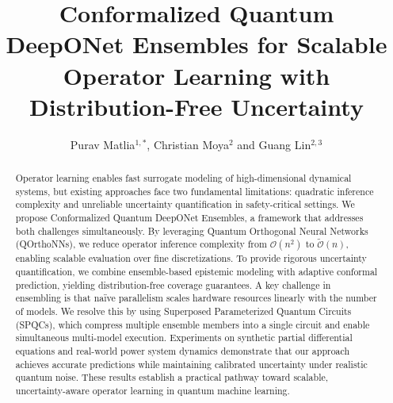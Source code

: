 \documentclass{iopjournal}
\begin{document}

\title{Conformalized Quantum DeepONet Ensembles for Scalable Operator Learning with Distribution-Free Uncertainty}

\author{Purav Matlia$^{1, *}$, Christian Moya$^2$ and Guang Lin$^{2,3}$}







\begin{abstract}
Operator learning enables fast surrogate modeling of high-dimensional dynamical systems, but existing approaches face two fundamental limitations: quadratic inference complexity and unreliable uncertainty quantification in safety-critical settings.
We propose Conformalized Quantum DeepONet Ensembles, a framework that addresses both challenges simultaneously. By leveraging Quantum Orthogonal Neural Networks (QOrthoNNs), we reduce operator inference complexity from $\mathcal{O}(n^2)$ to $\tilde{\mathcal{O}}(n)$, enabling scalable evaluation over fine discretizations. To provide rigorous uncertainty quantification, we combine ensemble-based epistemic modeling with adaptive conformal prediction, yielding distribution-free coverage guarantees. A key challenge in ensembling is that naïve parallelism scales hardware resources linearly with the number of models. We resolve this by using Superposed Parameterized Quantum Circuits (SPQCs), which compress multiple ensemble members into a single circuit and enable simultaneous multi-model execution. Experiments on synthetic partial differential equations and real-world power system dynamics demonstrate that our approach achieves accurate predictions while maintaining calibrated uncertainty under realistic quantum noise. These results establish a practical pathway toward scalable, uncertainty-aware operator learning in quantum machine learning.
\end{abstract}
\end{document}
